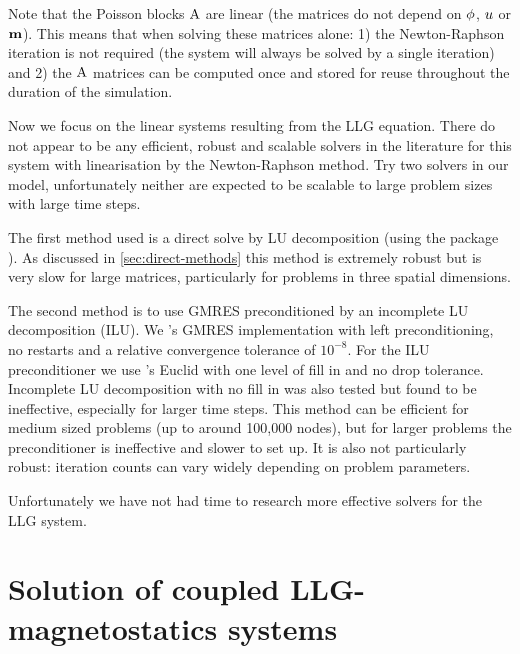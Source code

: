 Note that the Poisson blocks $\mathrm{A}$ are linear (the matrices do not depend on $\phi$, $u$ or $\boldsymbol{\mathrm{m}}$).
This means that when solving these matrices alone: 1) the Newton-Raphson iteration is not required (\ie the system will always be solved by a single iteration) and 2) the $\mathrm{A}$ matrices can be computed once and stored for reuse throughout the duration of the simulation.


Now we focus on the linear systems resulting from the LLG equation.
There do not appear to be any efficient, robust and scalable solvers in the literature for this system with linearisation by the Newton-Raphson method.
Try two solvers in our model, unfortunately neither are expected to be scalable to large problem sizes with large time steps.

The first method used is a direct solve by LU decomposition (using the \superlu package \cite{superlu}).
As discussed in \cref{sec:direct-methods} this method is extremely robust but is very slow for large matrices, particularly for problems in three spatial dimensions.

The second method is to use GMRES preconditioned by an incomplete LU decomposition (ILU).
We \oomph's GMRES implementation with left preconditioning, no restarts and a relative convergence tolerance of $10^{-8}$.
For the ILU preconditioner we use \hypre's Euclid with one level of fill in and no drop tolerance.
Incomplete LU decomposition with no fill in was also tested but found to be ineffective, especially for larger time steps.
This method can be efficient for medium sized problems (up to around 100,000 nodes), but for larger problems the preconditioner is ineffective and slower to set up.
It is also not particularly robust: iteration counts can vary widely depending on problem parameters.

Unfortunately we have not had time to research more effective solvers for the LLG system.

\section{Solution of coupled LLG-magnetostatics systems}
\label{sec:solut-coupl-syst}

